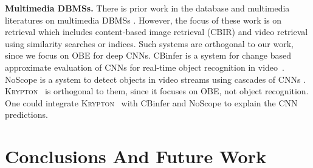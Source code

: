 \documentclass[10pt, sigconf]{acmart}
\newcommand{\system}{\textsc{Krypton}}
\begin{document}
\vspace{2mm}
\noindent \textbf{Multimedia DBMSs.} There is prior work in the database and multimedia literatures on multimedia DBMSs \cite{adjeroh1997multimedia,kalipsiz2000multimedia}.
However, the focus of these work is on retrieval which includes content-based image retrieval (CBIR) and video retrieval using similarity searches or indices.
Such systems are orthogonal to our work, since we focus on OBE for deep CNNs.
CBinfer is a system for change based approximate evaluation of CNNs for real-time object recognition in video~\cite{cavigelli2017cbinfer}.
NoScope is a system to detect objects in video streams using cascades of CNNs \cite{kang2017noscope}.
\system~ is orthogonal to them, since it focuses on OBE, not object recognition.
One could integrate \system~ with CBinfer and NoScope to explain the CNN predictions.


\section{Conclusions And Future Work}





\end{document}
